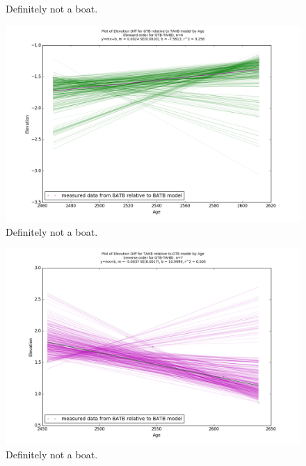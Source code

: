 \documentclass{article}
\begin{document}
\begin{figure}[h]
	\caption{Definitely not a boat.}
	\label{fig:data_GTBxTAHB}
\end{figure}
\newpage

\begin{figure}[h]
	\includegraphics[width=\linewidth]{data/gias/theGIA_GTB_relative_to_TAHB.png}
	\caption{Definitely not a boat.}
	\label{fig:gias_GTBxTAHB}
\end{figure}
\newpage


\begin{figure}[h]
	\includegraphics[width=\linewidth]{data/gias/theGIA_TAHB_relative_to_GTB.png}
	\caption{Definitely not a boat.}
	\label{fig:gias_TAHBxGTB}
\end{figure}
\newpage
\end{document}
